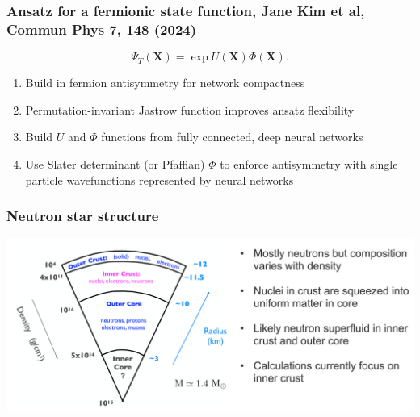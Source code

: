 \documentclass{beamer}
\begin{document}
\begin{frame}
\frametitle{Ansatz for a fermionic state function, Jane Kim et al, Commun Phys 7, 148 (2024)}

\[
\Psi_T(\bm{X}) =\exp{U(\bm{X})}\Phi(\bm{X}).
\]

\begin{block}{}
\begin{enumerate}
\item Build in fermion antisymmetry for network compactness

\item Permutation-invariant Jastrow function improves ansatz flexibility

\item Build $U$ and $\Phi$ functions from fully connected, deep neural networks

\item Use Slater determinant (or Pfaffian) $\Phi$ to enforce antisymmetry with single particle wavefunctions represented by neural networks
\end{enumerate}

\noindent
\end{block}
\end{frame}

\begin{frame}
\frametitle{Neutron star structure}

\vspace{6mm}

\centerline{\includegraphics[width=1.0\linewidth]{figures/mbpfig5.png}}

\vspace{6mm}
\end{frame}
\end{document}
